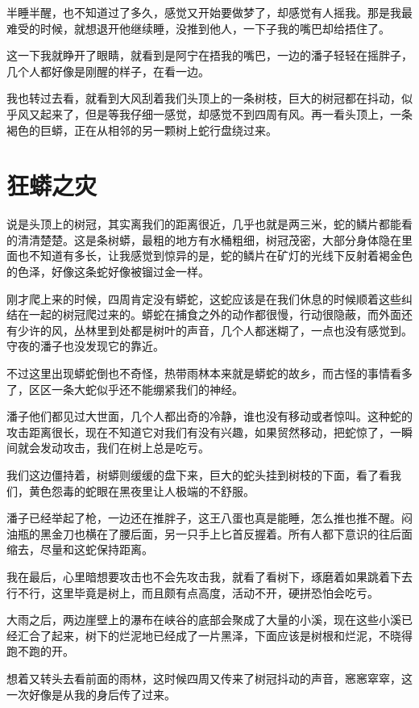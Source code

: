 半睡半醒，也不知道过了多久，感觉又开始要做梦了，却感觉有人摇我。那是我最难受的时候，就想退开他继续睡，没推到他人，一下子我的嘴巴却给捂住了。

这一下我就睁开了眼睛，就看到是阿宁在捂我的嘴巴，一边的潘子轻轻在摇胖子，几个人都好像是刚醒的样子，在看一边。

我也转过去看，就看到大风刮着我们头顶上的一条树枝，巨大的树冠都在抖动，似乎风又起来了，但是等我仔细一感觉，却感觉不到四周有风。再一看头顶上，一条褐色的巨蟒，正在从相邻的另一颗树上蛇行盘绕过来。

\chapter{狂蟒之灾}

说是头顶上的树冠，其实离我们的距离很近，几乎也就是两三米，蛇的鳞片都能看的清清楚楚。这是条树蟒，最粗的地方有水桶粗细，树冠茂密，大部分身体隐在里面也不知道有多长，让我感觉到惊异的是，蛇的鳞片在矿灯的光线下反射着褐金色的色泽，好像这条蛇好像被镏过金一样。

刚才爬上来的时候，四周肯定没有蟒蛇，这蛇应该是在我们休息的时候顺着这些纠结在一起的树冠爬过来的。蟒蛇在捕食之外的动作都很慢，行动很隐蔽，而外面还有少许的风，丛林里到处都是树叶的声音，几个人都迷糊了，一点也没有感觉到。守夜的潘子也没发现它的靠近。

不过这里出现蟒蛇倒也不奇怪，热带雨林本来就是蟒蛇的故乡，而古怪的事情看多了，区区一条大蛇似乎还不能绷紧我们的神经。

潘子他们都见过大世面，几个人都出奇的冷静，谁也没有移动或者惊叫。这种蛇的攻击距离很长，现在不知道它对我们有没有兴趣，如果贸然移动，把蛇惊了，一瞬间就会发动攻击，我们在树上总是吃亏。

我们这边僵持着，树蟒则缓缓的盘下来，巨大的蛇头挂到树枝的下面，看了看我们，黄色怨毒的蛇眼在黑夜里让人极端的不舒服。

潘子已经举起了枪，一边还在推胖子，这王八蛋也真是能睡，怎么推也推不醒。闷油瓶的黑金刀也横在了腰后面，另一只手上匕首反握着。所有人都下意识的往后面缩去，尽量和这蛇保持距离。

我在最后，心里暗想要攻击也不会先攻击我，就看了看树下，琢磨着如果跳着下去行不行，这里毕竟是树上，而且颇有点高度，活动不开，硬拼恐怕会吃亏。

大雨之后，两边崖壁上的瀑布在峡谷的底部会聚成了大量的小溪，现在这些小溪已经汇合了起来，树下的烂泥地已经成了一片黑泽，下面应该是树根和烂泥，不晓得跑不跑的开。

想着又转头去看前面的雨林，这时候四周又传来了树冠抖动的声音，窸窸窣窣，这一次好像是从我的身后传了过来。

